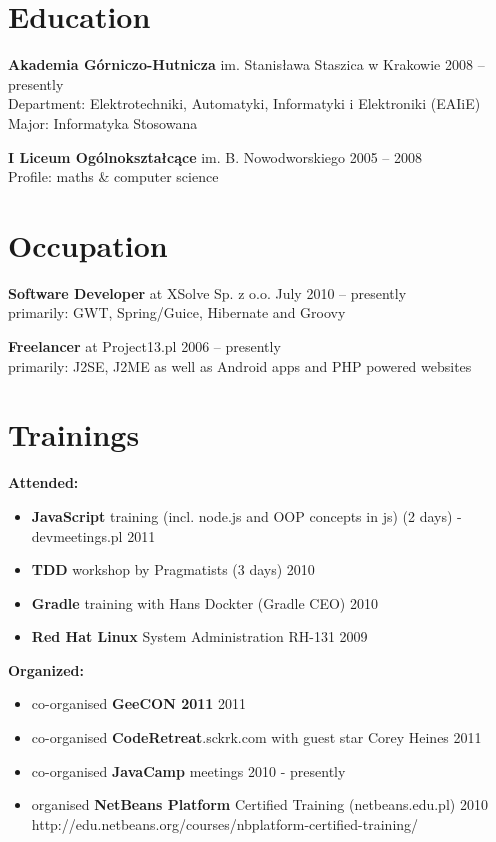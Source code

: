 \documentclass{res}
\begin{document}
\begin{resume} 

\section{Education} 
{\bf Akademia Górniczo-Hutnicza} im. Stanisława Staszica w Krakowie \hfill 2008 – presently\\
	Department: Elektrotechniki, Automatyki, Informatyki i Elektroniki (EAIiE) \\
	Major: Informatyka Stosowana 

{\bf I Liceum Ogólnokształcące} im. B. Nowodworskiego \hfill 2005 – 2008\\
	Profile: maths \& computer science

\section{Occupation}
{\bf Software Developer} at XSolve Sp. z o.o. \hfill July 2010 – presently\\
	primarily: GWT, Spring/Guice, Hibernate and Groovy

{\bf Freelancer} at Project13.pl \hfill 2006 – presently\\
	primarily: J2SE, J2ME as well as Android apps and PHP powered websites

\section{Trainings} 
{\bf Attended:}
\begin{itemize}
 \item \textbf{JavaScript} training (incl. node.js and OOP concepts in js) (2 days) - devmeetings.pl \hfill 2011
 \item \textbf{TDD} workshop by Pragmatists (3 days) \hfill 2010
 \item \textbf{Gradle} training with Hans Dockter (Gradle CEO) \hfill 2010
 \item \textbf{Red Hat Linux} System Administration RH-131 \hfill 2009
\end{itemize}
{\bf Organized:}
\begin{itemize}
 \item co-organised \textbf{GeeCON 2011} \hfill 2011
 \item co-organised \textbf{CodeRetreat}.sckrk.com with guest star Corey Heines \hfill 2011
 \item co-organised \textbf{JavaCamp} meetings \hfill 2010 - presently
 \item organised \textbf{NetBeans Platform} Certified Training (netbeans.edu.pl) \hfill 2010 \\
	http://edu.netbeans.org/courses/nbplatform-certified-training/ 
\end{itemize}


\end{resume}
\end{document}
